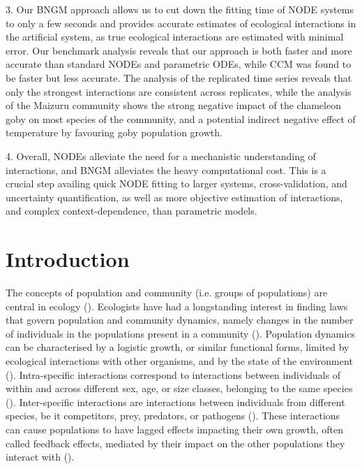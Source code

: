 \documentclass[11pt, oneside]{article}
\begin{document}
3. Our BNGM approach allows us to cut down the fitting time of NODE systems to only a few seconds and provides accurate estimates of ecological interactions in the artificial system, as true ecological interactions are estimated with minimal error.
Our benchmark analysis reveals that our approach is both faster and more accurate than standard NODEs and parametric ODEs, while CCM was found to be faster but less accurate. 
The analysis of the replicated time series reveals that only the strongest interactions are consistent across replicates, while the analysis of the Maizuru community shows the strong negative impact of the chameleon goby on most species of the community, and a potential indirect negative effect of temperature by favouring goby population growth.

4. Overall, NODEs alleviate the need for a mechanistic understanding of interactions, and BNGM alleviates the heavy computational cost. 
This is a crucial step availing quick NODE fitting to larger systems, cross-validation, and uncertainty quantification, as well as more objective estimation of interactions, and complex context-dependence, than parametric models. 

\newpage
{}
\setcounter{page}{1}
\linenumbers
{}

\section{Introduction}

The concepts of population and community (i.e. groups of populations) are central in ecology (\cite{Berryman2002}).
Ecologists have had a longstanding interest in finding laws that govern population and community dynamics, namely changes in the number of individuals in the populations present in a community (\cite{Lawton1999,Turchin1999a}).
Population dynamics can be characterised by a logistic growth, or similar functional forms, limited by ecological interactions with other organisms, and by the state of the environment (\cite{Turchin2001c,Berryman2003}).
Intra-specific interactions correspond to interactions between individuals of within and across different sex, age, or size classes, belonging to the same species (\cite{Turchin2001c}).
Inter-specific interactions are interactions between individuals from different species, be it competitors, prey, predators, or pathogens (\cite{Turchin2001c,Berryman2003}).
These interactions can cause populations to have lagged effects impacting their own growth, often called feedback effects, mediated by their impact on the other populations they interact with (\cite{Berryman1997}).
\end{document}
